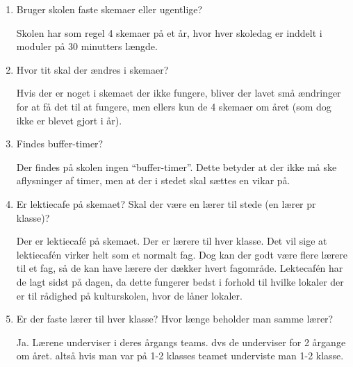 \begin{enumerate}
	Tanken var også oprindeligt at der i løbet af et år skulle være 4 skemaer. Grundet at det tog så lang tid at lægge skemaet, og at det var et meget stort arbejde, er der ingen der har taget initiativ til at der skulle lægges et nyt, da der var gået 1/4 af skoleåret. Derfor bliver der enten kun 2 skemaer i løbet af året, eller i værste fald kun dette ene.

	Skolen har eksperimenteret med fagdage, altså hvor en hel dag var sat af til et enkelt fag. Erfaringerne fra dette var dog at det førte til meget spildtid, og at lærerene blev meget frustreret over det.

	Til at holde styr på timer, har de brugt Microsoft Excel.

	
	\item Bruger skolen faste skemaer eller ugentlige?

	Skolen har som regel 4 skemaer på et år, hvor hver skoledag er inddelt i moduler på 30 minutters længde.

	\item Hvor tit skal der ændres i skemaer?

	Hvis der er noget i skemaet der ikke fungere, bliver der lavet små ændringer for at få det til at fungere, men ellers kun de 4 skemaer om året (som dog ikke er blevet gjort i år).


	\item Findes buffer-timer? 

	Der findes på skolen ingen ``buffer-timer''. Dette betyder at der ikke må ske aflysninger af timer, men at der i stedet skal sættes en vikar på.


	\item Er lektiecafe på skemaet? Skal der være en lærer til stede (en lærer pr klasse)?

	Der er lektiecaf\'e på skemaet. Der er lærere til hver klasse. Det vil sige at lektiecaf\'en virker helt som et normalt fag. Dog kan der godt være flere lærere til et fag, så de kan have lærere der dækker hvert fagområde. Lektecaf\'en har de lagt sidst på dagen, da dette fungerer bedst i forhold til hvilke lokaler der er til rådighed på kulturskolen, hvor de låner lokaler.

	
	\item Er der faste lærer til hver klasse? Hvor længe beholder man samme lærer?

	Ja. Lærene underviser i deres årgangs teams. dvs de underviser for 2 årgange om året. altså hvis man var på 1-2 klasses teamet underviste man 1-2 klasse.
	

\end{enumerate}
